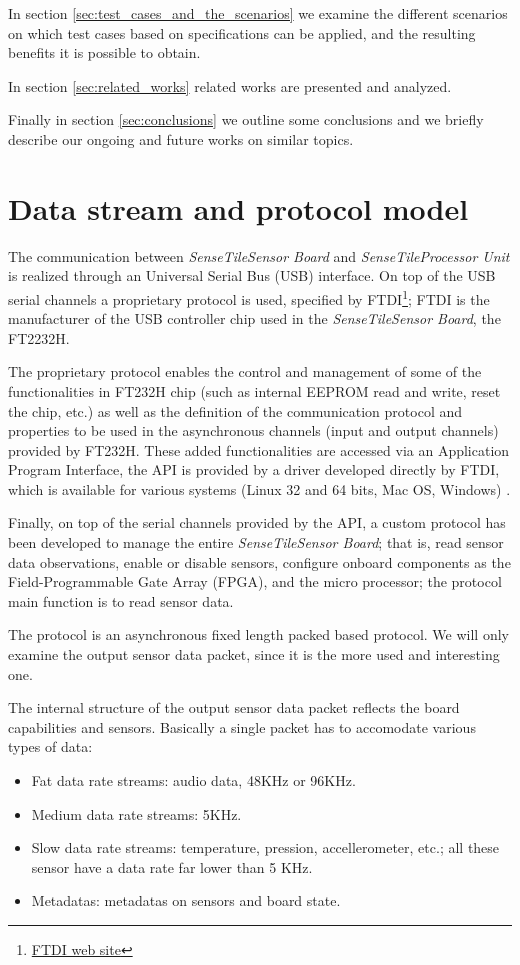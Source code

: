 \documentclass{article}
\newcommand{\myhref}[2]{\ifpdf\href{#1}{#2}\else\htmladdnormallinkfoot{#2}{#1}\fi}
\newcommand{\ST}{\emph{SenseTile}\xspace}
\newcommand{\STSB}{\ST \emph{Sensor Board}\xspace}
\newcommand{\STPU}{\ST \emph{Processor Unit}\xspace}
\begin{document}
In section \ref{sec:test_cases_and_the_scenarios} we examine the different 
scenarios on which test cases based on specifications can be applied, and 
the resulting benefits it is possible to obtain.

In section \ref{sec:related_works} related works are presented and analyzed.

Finally in section \ref{sec:conclusions} we outline some conclusions and we 
briefly describe our ongoing and future works on similar topics.


\section{Data stream and protocol model}
\label{sec:data_stream_and_protocol_model}

The communication between \STSB and \STPU is realized through an Universal 
Serial Bus (USB) interface.
On top of the USB serial channels a proprietary protocol is used, specified by 
FTDI\footnote{\myhref{http://www.ftdichip.com/}{FTDI web site}}; FTDI is the 
manufacturer of the USB controller chip used in the \STSB, the 
FT2232H\cite{ftdi_ft232h_2009}.

The proprietary protocol enables the control and management of some of the 
functionalities in FT232H chip (such as internal EEPROM read and write, reset 
the chip, etc.) as well as the definition of the communication protocol and 
properties to be used in the asynchronous channels (input and output channels) 
provided by FT232H.
These added functionalities are accessed via an Application Program Interface,
the API is provided by a driver developed directly by FTDI, which is available 
for various systems (Linux 32 and 64 bits, Mac OS, Windows)
\cite{ftdi_d2xx_api_2009}.

Finally, on top of the serial channels provided by the API, a custom protocol 
has been developed to manage the entire \STSB; that is, read sensor data 
observations, enable or disable sensors, configure onboard components 
as the Field-Programmable Gate Array (FPGA), and the micro processor; the 
protocol main function is to read sensor data.

The protocol is an asynchronous fixed length packed based protocol.
We will only examine the output sensor data packet, since it is the more used 
and interesting one.

The internal structure of the output sensor data packet reflects the board 
capabilities and sensors.
Basically a single packet has to accomodate various types of data:
\begin{itemize}
 \item Fat data rate streams: audio data, 48KHz or 96KHz.
 \item Medium data rate streams: 5KHz.
 \item Slow data rate streams: temperature, pression, accellerometer, etc.; all 
 these sensor have a data rate far lower than 5 KHz.
 \item Metadatas: metadatas on sensors and board state.
\end{itemize}
\end{document}
